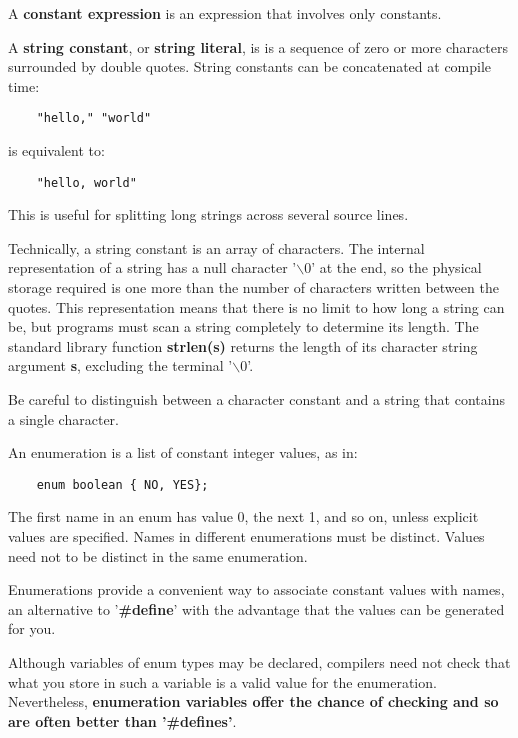 \documentclass{article}
\begin{document}
A \textbf{constant expression} is an expression that involves only constants.

\clearpage
A \textbf{string constant}, or \textbf{string literal}, is is a sequence of zero or more characters surrounded by double quotes.
String constants can be concatenated at compile time: 

\begin{lstlisting}
	"hello," "world"
\end{lstlisting}

\vspace{8pt}

is equivalent to:

\begin{lstlisting}
	"hello, world"
\end{lstlisting}

This is useful for splitting long strings across several source lines.

Technically, a string constant is an array of characters. The internal representation of a string has a null character '$\backslash$0' at the end, so the physical storage required is one more than the number of characters written between the quotes. This representation means that there is no limit to how long a string can be, but programs must scan a string completely to determine its length. The standard library function \textbf{strlen(s)} returns the length of its character string argument \textbf{s}, excluding the terminal '$\backslash$0'.

Be careful to distinguish between a character constant and a string that contains a single character.

An enumeration is a list of constant integer values, as in:

\begin {lstlisting}
	enum boolean { NO, YES};
\end{lstlisting}

The first name in an enum has value 0, the next 1, and so on, unless explicit values are specified. 
Names in different enumerations must be distinct. Values need not to be distinct in the same enumeration.

Enumerations provide a convenient way to associate constant values with names, an alternative to '\textbf{\#define}' with the advantage that the values can be generated for you. 

Although variables of enum types may be declared, compilers need not check that what you store in such a variable is a valid value for the enumeration. Nevertheless, \textbf{enumeration variables offer the chance of checking and so are often better than '\#defines'}.
\end{document}
